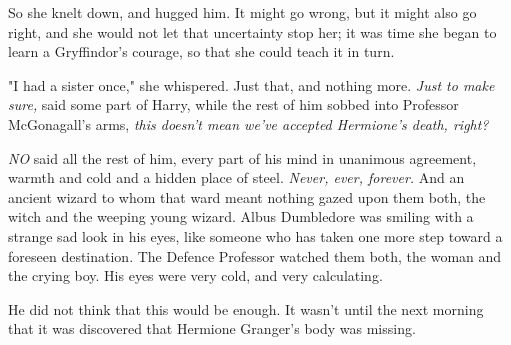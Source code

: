 So she knelt down, and hugged him. It might go wrong, but it might also go
right, and she would not let that uncertainty stop her; it was time she began
to learn a Gryffindor's courage, so that she could teach it in turn.

"I had a sister once," she whispered. Just that, and nothing more.
\later
\emph{Just to make sure,} said some part of Harry, while the rest of him sobbed
into Professor McGonagall's arms, \emph{this doesn't mean we've accepted
Hermione's death, right?}

\emph{NO} said all the rest of him, every part of his mind in unanimous
agreement, warmth and cold and a hidden place of steel. \emph{Never, ever,
forever.}
\later
And an ancient wizard to whom that ward meant nothing gazed upon them both, the
witch and the weeping young wizard. Albus Dumbledore was smiling with a strange
sad look in his eyes, like someone who has taken one more step toward a
foreseen destination.
\later
The Defence Professor watched them both, the woman and the crying boy. His eyes
were very cold, and very calculating.

He did not think that this would be enough.
\later
It wasn't until the next morning that it was discovered that Hermione Granger's
body was missing.

